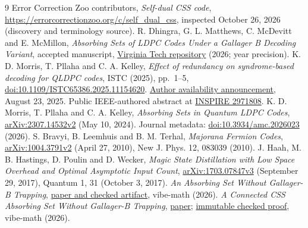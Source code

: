 \documentclass[11pt]{article}
\begin{document}
\clearpage
\appendix

\clearpage
\begin{thebibliography}{9}
 Error Correction Zoo contributors, \emph{Self-dual CSS code}, \url{https://errorcorrectionzoo.org/c/self_dual_css}, inspected October 26, 2026 (discovery and terminology source).
 R. Dhingra, G. L. Matthews, C. McDevitt and E. McMillon, \emph{Absorbing Sets of LDPC Codes Under a Gallager B Decoding Variant}, accepted manuscript, \href{https://hdl.handle.net/10919/140590}{Virginia Tech repository} (2026; year precision).
 K. D. Morris, T. Pllaha and C. A. Kelley, \emph{Effect of redundancy on syndrome-based decoding for QLDPC codes}, ISTC (2025), pp.~1--5, \href{https://doi.org/10.1109/ISTC65386.2025.11154620}{doi:10.1109/ISTC65386.2025.11154620}. \href{https://kirstendmorris.github.io/}{Author availability announcement}, August 23, 2025. Public IEEE-authored abstract at \href{https://inspirehep.net/literature/2971808}{INSPIRE 2971808}.
 K. D. Morris, T. Pllaha and C. A. Kelley, \emph{Absorbing Sets in Quantum LDPC Codes}, \href{https://arxiv.org/abs/2307.14532v2}{arXiv:2307.14532v2} (May 10, 2024). Journal metadata: \href{https://doi.org/10.3934/amc.2026023}{doi:10.3934/amc.2026023} (2026).
 S. Bravyi, B. Leemhuis and B. M. Terhal, \emph{Majorana Fermion Codes}, \href{https://arxiv.org/abs/1004.3791v2}{arXiv:1004.3791v2} (April 27, 2010), New J. Phys. 12, 083039 (2010).
 J. Haah, M. B. Hastings, D. Poulin and D. Wecker, \emph{Magic State Distillation with Low Space Overhead and Optimal Asymptotic Input Count}, \href{https://arxiv.org/abs/1703.07847v3}{arXiv:1703.07847v3} (September 29, 2017), Quantum 1, 31 (October 3, 2017).
 \emph{An Absorbing Set Without Gallager-B Trapping}, \href{https://github.com/alectionary/vibe-math/blob/ff4172b090f4d38eadaf06fe419667f5b6bca585/formalization/gallager-b-absorbing/paper/main.pdf}{paper and checked artifact}, vibe-math (2026).
 \emph{A Connected CSS Absorbing Set Without Gallager-B Trapping}, \href{https://github.com/alectionary/vibe-math/blob/5a27bd061adfd3acdbf63580f99a030d430d9287/formalization/gallager-b-absorbing/connected/paper/main.pdf}{paper}; \href{https://github.com/alectionary/vibe-math/blob/65bcfe0d8573a392f250295fcfa3619b586e4159/formalization/gallager-b-absorbing/connected/Connected.lean}{immutable checked proof}, vibe-math (2026).
\end{thebibliography}
\end{document}

